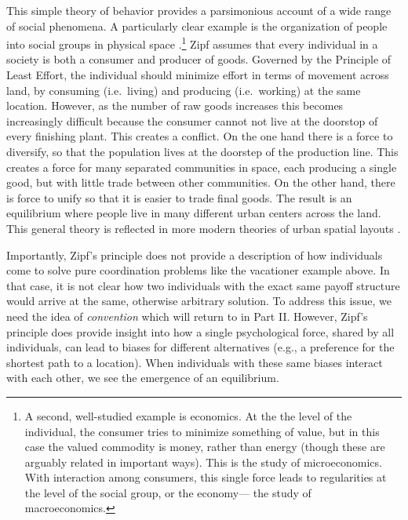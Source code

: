 \documentclass[man, noapacite, 12pt]{apa2}
\begin{document}
This simple theory of behavior provides a parsimonious account of a wide range of social phenomena. A particularly clear example is the organization of people into social  groups in physical space \cite{zipf1949human}.\footnote{A second, well-studied example is economics. At the the level of the individual, the consumer tries to minimize something of value, but in this case the valued commodity is money, rather than energy (though these are arguably related in important ways). This is the study of microeconomics. With interaction among consumers, this single force leads to regularities at the level of the social group, or the economy--- the study of macroeconomics.} Zipf assumes that every individual in a society is both a consumer and producer of goods. Governed by the Principle of Least Effort, the individual should minimize effort in terms of movement across land, by consuming (i.e.\ living) and producing (i.e.\ working) at the same location. However, as the number of raw goods increases this becomes increasingly difficult because the consumer cannot not live at the doorstop of every finishing plant. This creates a conflict. On the one hand there is a force to diversify, so that the population lives at the doorstep of the production line. This creates a force for many separated communities in space, each producing a single good, but with little trade between other communities. On the other hand, there is force to unify so that it is easier to trade final goods. The result is an equilibrium where people live in many different urban centers across the land. This general theory is reflected in more modern theories of urban spatial layouts \cite{mills1967aggregative, brueckner1987structure}.

Importantly, Zipf's principle does not provide a description of how individuals come to solve pure coordination problems like the vacationer example above. In that case, it is not clear how two individuals with the exact same payoff structure would arrive at the same, otherwise arbitrary solution. To address this issue, we need the idea of {\it convention} which will return to in Part II. However, Zipf's principle does provide insight into how a single psychological force, shared by all individuals, can lead to biases for different alternatives (e.g., a preference for the shortest path to a location). When individuals with these same biases interact with each other, we see the emergence of an equilibrium. 
\end{document}
